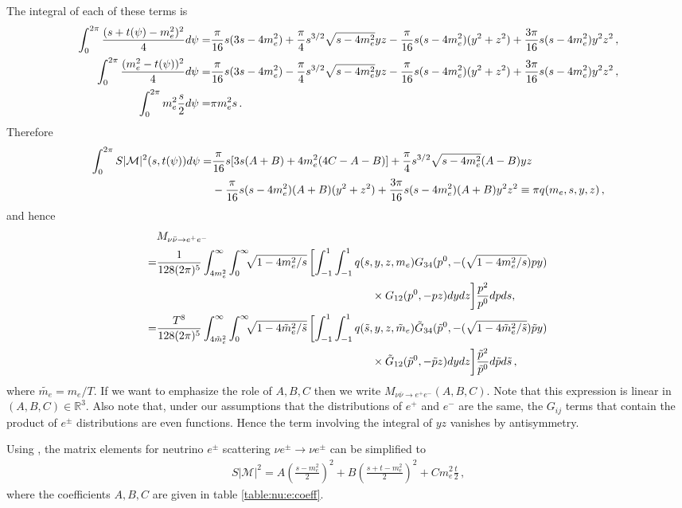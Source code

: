 The integral of each of these terms is
 \begin{align}
\int_0^{2\pi}\frac{(s+t(\psi)-m_e^2)^2}{4}d\psi=&\frac{\pi}{16}s(3s-4m_e^2)+\frac{\pi}{4}s^{3/2}\sqrt{s-4m_e^2}yz
-\frac{\pi}{16}s(s-4m_e^2)(y^2+z^2)+\frac{3\pi}{16}s(s-4m_e^2)y^2z^2\,,\\
\int_0^{2\pi} \frac{(m_e^2-t(\psi))^2}{4}d\psi=&\frac{\pi}{16}s(3s-4m_e^2)-\frac{\pi}{4}s^{3/2}\sqrt{s-4m_e^2}yz
-\frac{\pi}{16}s(s-4m_e^2)(y^2+z^2)+\frac{3\pi}{16}s(s-4m_e^2)y^2z^2\,,\notag\\
\int_0^{2\pi} m_e^2\frac{s}{2} d\psi=&\pi m_e^2s\,.\notag
\end{align}
Therefore 
\begin{align}
\int_0^{2\pi} S |\mathcal{M}|^2 (s,t(\psi))d\psi
=&\frac{\pi}{16}s[3s(A+B)+4m_e^2(4C-A-B)]+\frac{\pi}{4}s^{3/2}\sqrt{s-4m_e^2}(A-B)yz\\
&-\frac{\pi}{16}s(s-4m_e^2)(A+B)(y^2+z^2)+\frac{3\pi}{16}s(s-4m_e^2)(A+B)y^2z^2
\equiv \pi q(m_e,s,y,z)\,,\notag
\end{align}
and hence
\begin{align}
&M_{\nu\bar\nu\rightarrow e^+e^-}\\
=&\frac{1}{128(2\pi)^5 }\int_{4m_e^2}^\infty\int_0^\infty\!\!\!\sqrt{1-4m_e^2/s}\left[\int_{-1}^1\int_{-1}^1q(s,y,z,m_e)G_{34}(p^0,-(\sqrt{1-4m_e^2/s})p y)\right.\notag\\
&\hspace{68mm}\times G_{12}(p^0,-p z)dydz\bigg]\frac{ p^2}{p^0}dpds,\notag\\
=&\frac{T^8}{128(2\pi)^5 }\int_{4\tilde m_e^2}^\infty\int_0^\infty\!\!\!\sqrt{1-4\tilde m_e^2/\tilde s}\left[\int_{-1}^1 \int_{-1}^1q(\tilde s,y,z,\tilde m_e)\tilde G_{34}(\tilde p^0,-(\sqrt{1-4\tilde{m}_e^2/\tilde s})\tilde p y)\right.\notag\\
&\hspace{68mm}\times\tilde G_{12}(\tilde p^0,-\tilde p z)dydz\bigg] \frac{ \tilde p^2}{\tilde p^0}d\tilde pd\tilde s\,,\notag
\end{align}
where $\tilde{m_e}=m_e/T$.  If we want to emphasize the role of $A,B,C$ then we write $M_{\nu\bar\nu\rightarrow e^+e^-}(A,B,C)$.  Note that this expression is linear in $(A,B,C)\in\mathbb{R}^3$. Also note that, under our assumptions that the distributions of $e^+$ and $e^-$ are the same,  the $G_{ij}$ terms that contain the product of $e^\pm$ distributions are even functions. Hence the term involving the integral of $yz$ vanishes by antisymmetry.

Using , the matrix elements for neutrino $e^\pm$ scattering $\nu e^\pm\rightarrow \nu e^\pm$ can be simplified to
\begin{align}
S|\mathcal{M}|^2=A\left(\frac{s-m_e^2}{2}\right)^2+B\left(\frac{s+t-m_e^2}{2}\right)^2+Cm_e^2\frac{t}{2}\,,
\end{align}
 where the coefficients $A,B,C$ are given in table \ref{table:nu:e:coeff}.

